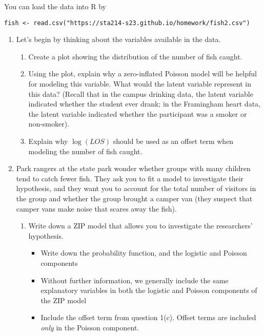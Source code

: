 \documentclass[11pt]{article}
\begin{document}
\noindent You can load the data into R by
\begin{verbatim}
fish <- read.csv("https://sta214-s23.github.io/homework/fish2.csv")
\end{verbatim}

\begin{enumerate}

\item Let's begin by thinking about the variables available in the data.
\begin{enumerate}
\item Create a plot showing the distribution of the number of fish caught.


\item Using the plot, explain why a zero-inflated Poisson model will be helpful for modeling this variable. What would the latent variable represent in this data? (Recall that in the campus drinking data, the latent variable indicated whether the student ever drank; in the Framingham heart data, the latent variable indicated whether the participant was a smoker or non-smoker).

\item Explain why $\log(LOS)$ should be used as an offset term when modeling the number of fish caught.
\end{enumerate}

\item Park rangers at the state park wonder whether groups with many children tend to catch fewer fish. They ask you to fit a model to investigate their hypothesis, and they want you to account for the total number of visitors in the group and whether the group brought a camper van (they suspect that camper vans make noise that scares away the fish).

\begin{enumerate}
\item Write down a ZIP model that allows you to investigate the researchers' hypothesis.
\begin{itemize}
\item Write down the probability function, and the logistic and Poisson components
\item Without further information, we generally include the same explanatory variables in both the logistic and Poisson components of the ZIP model
\item Include the offset term from question 1(c). Offset terms are included \textit{only} in the Poisson component.
\end{itemize}


\end{enumerate}
\end{enumerate}
\end{document}
